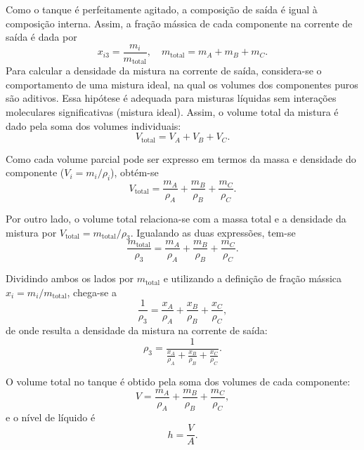 \documentclass{article}
\begin{document}
Como o tanque é perfeitamente agitado, a composição de saída é igual à composição interna. Assim, a fração mássica de cada componente na corrente de saída é dada por
\begin{equation}
  x_{i3} = \frac{m_i}{m_{\text{total}}}, \quad m_{\text{total}} = m_A + m_B + m_C. \label{eq:fracao-q2}
\end{equation}
Para calcular a densidade da mistura na corrente de saída, considera-se o comportamento de uma mistura ideal, na qual os volumes dos componentes puros são aditivos. Essa hipótese é adequada para misturas líquidas sem interações moleculares significativas (mistura ideal). Assim, o volume total da mistura é dado pela soma dos volumes individuais:
\begin{equation*}
  V_{\text{total}} = V_A + V_B + V_C.
\end{equation*}

Como cada volume parcial pode ser expresso em termos da massa e densidade do componente ($V_i = m_i/\rho_i$), obtém-se
\begin{equation*}
  V_{\text{total}} = \frac{m_A}{\rho_A} + \frac{m_B}{\rho_B} + \frac{m_C}{\rho_C}.
\end{equation*}

Por outro lado, o volume total relaciona-se com a massa total e a densidade da mistura por $V_{\text{total}} = m_{\text{total}}/\rho_3$. Igualando as duas expressões, tem-se
\begin{equation*}
  \frac{m_{\text{total}}}{\rho_3} = \frac{m_A}{\rho_A} + \frac{m_B}{\rho_B} + \frac{m_C}{\rho_C}.
\end{equation*}

Dividindo ambos os lados por $m_{\text{total}}$ e utilizando a definição de fração mássica $x_i = m_i/m_{\text{total}}$, chega-se a
\begin{equation*}
  \frac{1}{\rho_3} = \frac{x_A}{\rho_A} + \frac{x_B}{\rho_B} + \frac{x_C}{\rho_C},
\end{equation*}
de onde resulta a densidade da mistura na corrente de saída:
\begin{equation}
  \rho_3 = \frac{1}{\frac{x_A}{\rho_A} + \frac{x_B}{\rho_B} + \frac{x_C}{\rho_C}}. \label{eq:densidade-q2}
\end{equation}

O volume total no tanque é obtido pela soma dos volumes de cada componente:
\begin{equation}
  V = \frac{m_A}{\rho_A} + \frac{m_B}{\rho_B} + \frac{m_C}{\rho_C}, \label{eq:volume-q2}
\end{equation}
e o nível de líquido é
\begin{equation}
  h = \frac{V}{A}. \label{eq:nivel-q2}
\end{equation}
\end{document}
